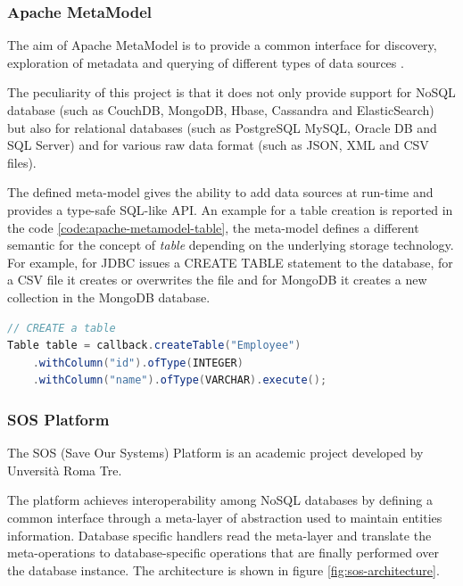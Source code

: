 \subsubsection{Apache MetaModel}
The aim of Apache MetaModel is to provide a common interface for discovery, exploration of metadata and querying of different types of data sources \cite{online:apache-metamodel}.

\noindent The peculiarity of this project is that it does not only provide support for NoSQL database (such as CouchDB, MongoDB, Hbase, Cassandra and ElasticSearch) but also for relational databases (such as PostgreSQL MySQL, Oracle DB and SQL Server) and for various raw data format (such as JSON, XML and CSV files).
 
\noindent The defined meta-model gives the ability to add data sources at run-time and provides a type-safe SQL-like API. An example for a table creation is reported in the code \ref{code:apache-metamodel-table}, the meta-model defines a different semantic for the concept of \textit{table} depending on the underlying storage technology. For example, for JDBC issues a CREATE TABLE statement to the database, for a CSV file it creates or overwrites the file and for MongoDB it creates a new collection in the MongoDB database.

\begin{lstlisting}[language=Java, caption=Apache MetaModel example, label=code:apache-metamodel-table]
// CREATE a table
Table table = callback.createTable("Employee")
    .withColumn("id").ofType(INTEGER)
    .withColumn("name").ofType(VARCHAR).execute();
\end{lstlisting}
            
\subsubsection{SOS Platform}
The SOS (Save Our Systems) Platform \cite{paper:sos-platform} is an academic project developed by Unversit\`{a} Roma Tre.

\noindent The platform achieves interoperability among NoSQL databases by defining a common interface through a meta-layer of abstraction used to maintain entities information. Database specific handlers read the meta-layer and translate the meta-operations to database-specific operations that are finally performed over the database instance.
The architecture is shown in figure \ref{fig:sos-architecture}.

